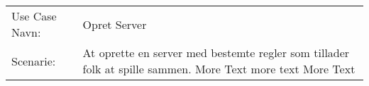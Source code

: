 \documentclass[danish,a4paper,twoside,11pt]{report}
\begin{document}
\begin{table}[h]
\begin{tabularx}{\textwidth}{|l|X|}
Use Case Navn:          & Opret Server \\
Scenarie:               & At oprette en server med bestemte regler som tillader folk at spille sammen. More Text more text More Text \\
\end{tabularx}
\end{table}
\end{document}
